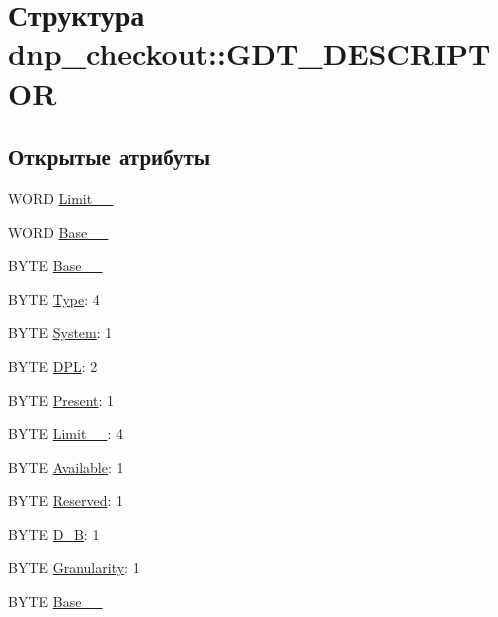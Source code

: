 \hypertarget{structdnp__checkout_1_1_g_d_t___d_e_s_c_r_i_p_t_o_r}{\section{Структура dnp\-\_\-checkout\-:\-:G\-D\-T\-\_\-\-D\-E\-S\-C\-R\-I\-P\-T\-O\-R}
\label{structdnp__checkout_1_1_g_d_t___d_e_s_c_r_i_p_t_o_r}
}
\subsection*{Открытые атрибуты}
\begin{DoxyCompactItemize}
\item 
W\-O\-R\-D \hyperlink{structdnp__checkout_1_1_g_d_t___d_e_s_c_r_i_p_t_o_r_ad40a0d34619bd888debbeacc1b185080}{Limit\-\_\-\_}
\item 
W\-O\-R\-D \hyperlink{structdnp__checkout_1_1_g_d_t___d_e_s_c_r_i_p_t_o_r_ae1eea0aa6e312d73c6ffaae90bbf3d09}{Base\-\_\-\_}
\item 
B\-Y\-T\-E \hyperlink{structdnp__checkout_1_1_g_d_t___d_e_s_c_r_i_p_t_o_r_a1edc2804b7082949cbfd6ec49ffffdac}{Base\-\_\-\_}
\item 
B\-Y\-T\-E \hyperlink{structdnp__checkout_1_1_g_d_t___d_e_s_c_r_i_p_t_o_r_a9becb5fe3d764e026ad54800b497f163}{Type}\-: 4
\item 
B\-Y\-T\-E \hyperlink{structdnp__checkout_1_1_g_d_t___d_e_s_c_r_i_p_t_o_r_ada16a1711fb0d4326fa3fc4bd1819a97}{System}\-: 1
\item 
B\-Y\-T\-E \hyperlink{structdnp__checkout_1_1_g_d_t___d_e_s_c_r_i_p_t_o_r_a8bf8f064575befe62e5031f2f9dbca3d}{D\-P\-L}\-: 2
\item 
B\-Y\-T\-E \hyperlink{structdnp__checkout_1_1_g_d_t___d_e_s_c_r_i_p_t_o_r_a5534e0d01afecb9d3e0595a0b6d35e4f}{Present}\-: 1
\item 
B\-Y\-T\-E \hyperlink{structdnp__checkout_1_1_g_d_t___d_e_s_c_r_i_p_t_o_r_aa12929dd09a01fe80a34d03e08e0134e}{Limit\-\_\-\_}\-: 4
\item 
B\-Y\-T\-E \hyperlink{structdnp__checkout_1_1_g_d_t___d_e_s_c_r_i_p_t_o_r_a7f0a7ced2a48246025a23a6d6ec3202f}{Available}\-: 1
\item 
B\-Y\-T\-E \hyperlink{structdnp__checkout_1_1_g_d_t___d_e_s_c_r_i_p_t_o_r_a30d24e353b35225e85ba88b18b517bbe}{Reserved}\-: 1
\item 
B\-Y\-T\-E \hyperlink{structdnp__checkout_1_1_g_d_t___d_e_s_c_r_i_p_t_o_r_a28a358368ab2fc1eb21fadadfc805fa6}{D\-\_\-\-B}\-: 1
\item 
B\-Y\-T\-E \hyperlink{structdnp__checkout_1_1_g_d_t___d_e_s_c_r_i_p_t_o_r_a1b64918ca78391f2eb2b6f4cd353eccf}{Granularity}\-: 1
\item 
B\-Y\-T\-E \hyperlink{structdnp__checkout_1_1_g_d_t___d_e_s_c_r_i_p_t_o_r_a3db87a396c88dc387d682d266f54eeec}{Base\-\_\-\_}
\end{DoxyCompactItemize}


